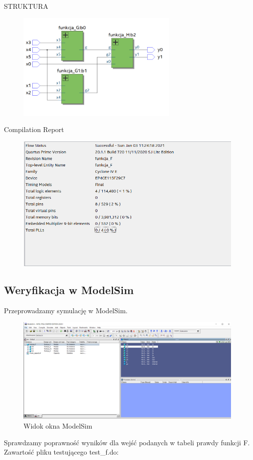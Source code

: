 \documentclass[]{article}
\begin{document}
\begin{center}
STRUKTURA
\end{center}
\begin{figure}[H]
	\centering
	\includegraphics[width=0.70\textwidth]{struktura3.png}
\end{figure}
\newpage
\begin{center}
    Compilation Report
\end{center}

\begin{figure}[H]
	\includegraphics[width=1.2\textwidth]{kompilacja_report3.png}
\end{figure}
\newpage
\subsection{Weryfikacja w ModelSim}
\par Przeprowadzamy symulację w ModelSim.
\begin{figure}[H]
	\centering
	\includegraphics[width=1.25\textwidth]{modelsim3.png}
	\caption{Widok okna ModelSim}
\end{figure}
Sprawdzamy poprawność wyników dla wejść podanych w tabeli prawdy funkcji F. 
\newpage
Zawartość pliku testującego test\_f.do:
\end{document}
